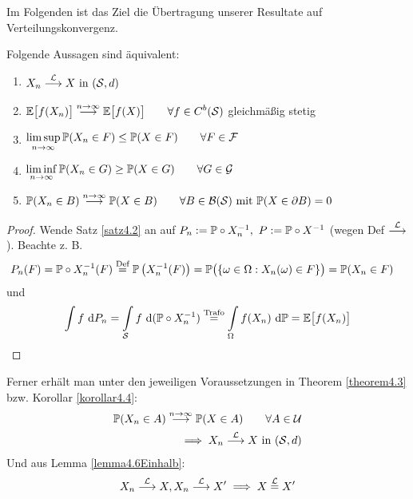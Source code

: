 Im Folgenden ist das Ziel die Übertragung unserer Resultate auf Verteilungskonvergenz.

\begin{satz}\label{satz4.7}\enter
Folgende Aussagen sind äquivalent:
\begin{enumerate}[label=(\arabic*)]
\item $\begin{aligned}
X_n\stackrel{\L}{\longrightarrow} X\text{ in }(\S,d)
\end{aligned}$
\item $\begin{aligned}
\E\big[f(X_n)\big]\stackrel{n\to\infty}{\longrightarrow}\E\big[f(X)\big]\qquad\forall f\in C^b(\S)
\end{aligned}$ gleichmäßig stetig
\item $\begin{aligned}
\limsup\limits_{n\to\infty}\P(X_n\in F)\leq\P(X\in F)\qquad\forall F\in\F
\end{aligned}$
\item $\begin{aligned}
\liminf\limits_{n\to\infty}\P(X_n\in G)\geq\P(X\in G)\qquad\forall G\in\G
\end{aligned}$
\item $\begin{aligned}
\P(X_n\in B)\stackrel{n\to\infty}{\longrightarrow}\P(X\in B)\qquad\forall B\in\B(\S)\mit\P(X\in\partial B)=0
\end{aligned}$
\end{enumerate}
\end{satz}
\begin{proof}
Wende Satz \ref{satz4.2} an auf $P_n:=\P\circ X^{-1}_n,~P:=\P\circ X^{-1}$ (wegen Def $\stackrel{\L}{\longrightarrow}$). Beachte z. B.
\begin{align*}
P_n(F)&=\P\circ X^{-1}_n(F)
\stackeq{\text{Def}}
\P\left(X_n^{-1}(F)\right)
=\P\big(\lbrace\omega\in\Omega:X_n(\omega)\in F\rbrace\big)
=\P(X_n\in F)
\end{align*}
und 
\begin{align*}
\int\limits f\d P_n
=
\int\limits_{\S} f\d(\P\circ X_n^{-1})
\stackeq{\text{Trafo}}
\int\limits_\Omega f(X_n)\d\P
=\E\big[f(X_n)\big]
\end{align*}
\end{proof}

Ferner erhält man unter den jeweiligen Voraussetzungen in Theorem \ref{theorem4.3} bzw. Korollar \ref{korollar4.4}:
\begin{align*}
\P(X_n\in A)\stackrel{n\to\infty}{\longrightarrow}\P(X\in A)\qquad\forall A\in\U\\
\implies X_n\stackrel{\L}{\longrightarrow} X\text{ in }(\S,d)
\end{align*}
Und aus Lemma \ref{lemma4.6Einhalb}:
\begin{align*}
X_n\stackrel{\L}{\longrightarrow} X,X_n\stackrel{\L}{\longrightarrow} X'\implies X\stackeq{\L}X'
\end{align*}

